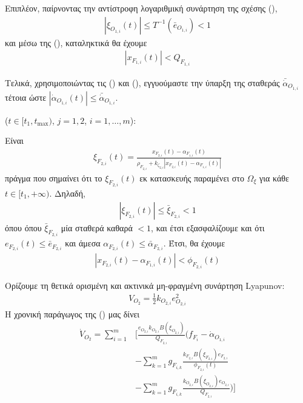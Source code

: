 \begin{proof_of_theorem}
\begin{step}
\bigskip
Επιπλέον, παίρνοντας την αντίστροφη λογαριθμική συνάρτηση της σχέσης (),
\begin{align}
\left|\xi_{O_{1,i}}(t)\right| \leq T^{-1}(\bar{e}_{O_{1,i}}) < 1 \label{xiO1abs}
\end{align}
και μέσω της (), καταληκτικά θα έχουμε
\begin{align}
|x_{F_{1, i}}(t)| < Q_{F_{1,i}} \label{conclusionO1}
\end{align}

\bigskip
Τελικά, χρησιμοποιώντας τις () και (), εγγυούμαστε την ύπαρξη της σταθεράς $\bar{\dot{\alpha}}_{O_{1,i}}$ τέτοια ώστε $\left|\dot{\alpha}_{O_{1,i}}(t)\right|\leq\bar{\dot{\alpha}}_{O_{1,i}}$.

\end{step}
\begin{step}\label{step:2:proof}

($t\in[t_1,t_{\text{max}})$, $j=1,2$, $i=1,\ldots,m$):

Είναι
\begin{align}
\xi_{F_{2, i}}(t) = \frac{x_{F_{2,i}}(t) - \alpha_{F_{1, i}}(t)}{\rho_{F_{2, i}} + k_{\zeta_{2, i}}|x_{F_{2,i}}(t) - \alpha_{F_{1, i}}(t)|} \label{xiF2_proving_its_inside_-1_1}
\end{align}
πράγμα που σημαίνει ότι το $\xi_{F_{2, i}}(t)$ εκ κατασκευής παραμένει στο $\Omega_{\xi}$ για κάθε $t\in[t_1, +\infty)$. Δηλαδή,
\begin{align}
|\xi_{F_{2, i}}(t)| \leq \bar{\xi}_{F_{2, i}} < 1 \label{xiF2abs}
\end{align}
όπου όπου $\bar{\xi}_{F_{2, i}}$ μία σταθερά καθαρά $<1$, και έτσι εξασφαλίζουμε και ότι $e_{F_{2, i}}(t) \leq \bar{e}_{F_{2, i}}$ και άμεσα $\alpha_{F_{2, i}}(t) \leq \bar{\alpha}_{F_{2, i}}$.
Έτσι, θα έχουμε
\begin{align}
\left| x_{F_{2,i}}(t) - \alpha_{F_{1,i}}(t) \right| < \phi_{F_{2, i}}(t) \label{conclusionF2}
\end{align}

\bigskip
Ορίζουμε τη θετικά ορισμένη και ακτινικά μη-φραγμένη συνάρτηση Lyapunov:
\begin{align}
V_{O_{2}} = \frac{1}{2}k_{O_{2,i}}e^2_{O_{2,i}} \label{VO2}
\end{align}
Η χρονική παράγωγος της () μας δίνει
\begin{align}
  \dot{V}_{O_{2}} = \sum_{i=1}^{m}&\Bigg[ \frac{e_{O_{2,i}} k_{O_{2,i}} B(\xi_{O_{2,i}})}{Q_{F_{2,i}}} \Bigg( f_{F_{i}} - \dot{\alpha}_{O_{1,i}} \nonumber \\
  &- \sum_{k=1}^{m} g_{F_{i,k}} \frac{ k_{F_{2,i}} B(\xi_{F_{2,i}}) e_{F_{2,i}} }{ \phi_{F_{2,i}}(t) } \nonumber \\
  &- \sum_{k=1}^{m} g_{F_{i,k}} \frac{ k_{O_{2,i}} B(\xi_{O_{2,i}}) e_{O_{2,i}} }{ Q_{F_{2,i}} } \Bigg) \Bigg]
  \end{align}


\end{step}
\end{proof_of_theorem}
